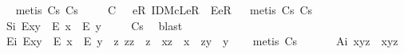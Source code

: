 \begin{isabellebody}
\isadelimproof
\ %
\endisadelimproof
%
\isatagproof
{}\isamarkupfalse%
\ {\isacharparenleft}metis\ Cs\ Cs{\isacharparenright}%
\endisatagproof
{\isafoldproof}%
%
\isadelimproof
%
\endisadelimproof
\isanewline
\ \ \ \isamarkupfalse%
\ C\ {\isacharcolon}\ {\isachardoublequoteopen}\isactrlbold {\isasymforall}{\isasymgamma}{\isachardot}\ \isactrlbold {\isasymexists}eR{\isachardot}\ IDMcL{\isacharparenleft}eR{\isacharparenright}\ \isactrlbold {\isasymand}\ E{\isacharparenleft}eR{\isasymcdot}{\isasymgamma}{\isacharparenright}{\isachardoublequoteclose}%
\isadelimproof
\ %
\endisadelimproof
%
\isatagproof
{}\isamarkupfalse%
\ {\isacharparenleft}metis\ Cs\ Cs{\isacharparenright}%
\endisatagproof
{\isafoldproof}%
%
\isadelimproof
%
\endisadelimproof
\isanewline
\isanewline
\ \ \ \isamarkupfalse%
\ S\isactrlsub i{\isacharcolon}\ {\isachardoublequoteopen}E{\isacharparenleft}x{\isasymcdot}y{\isacharparenright}\ \isactrlbold {\isasymrightarrow}\ {\isacharparenleft}E\ x\ \isactrlbold {\isasymand}\ E\ y{\isacharparenright}{\isachardoublequoteclose}%
\isadelimproof
\ \ \ %
\endisadelimproof
%
\isatagproof
{}\isamarkupfalse%
\ Cs\ \isamarkupfalse%
\ blast%
\endisatagproof
{\isafoldproof}%
%
\isadelimproof
%
\endisadelimproof
\isanewline
\ \ \ \isamarkupfalse%
\ E\isactrlsub i{\isacharcolon}\ {\isachardoublequoteopen}E{\isacharparenleft}x{\isasymcdot}y{\isacharparenright}\ \isactrlbold {\isasymleftarrow}\ {\isacharparenleft}E\ x\ \isactrlbold {\isasymand}\ E\ y\ \isactrlbold {\isasymand}\ {\isacharparenleft}\isactrlbold {\isasymexists}z{\isachardot}\ z{\isasymcdot}z\ {\isasymcong}\ z\ \isactrlbold {\isasymand}\ x{\isasymcdot}z\ {\isasymcong}\ x\ \isactrlbold {\isasymand}\ z{\isasymcdot}y\ {\isasymcong}\ y{\isacharparenright}{\isacharparenright}{\isachardoublequoteclose}%
\isadelimproof
\ \ %
\endisadelimproof
%
\isatagproof
{}\isamarkupfalse%
\ {\isacharparenleft}metis\ Cs{\isacharparenright}%
\endisatagproof
{\isafoldproof}%
%
\isadelimproof
%
\endisadelimproof
\ \isanewline
\ \ \ \isamarkupfalse%
\ A\isactrlsub i{\isacharcolon}\ {\isachardoublequoteopen}x{\isasymcdot}{\isacharparenleft}y{\isasymcdot}z{\isacharparenright}\ {\isasymcong}\ {\isacharparenleft}x{\isasymcdot}y{\isacharparenright}{\isasymcdot}z{\isachardoublequoteclose}%
\isadelimproof
\ \ \ \ \ \ \ \ %

\end{isabellebody}
